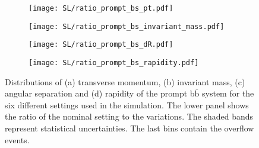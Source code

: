 \begin{figure}[H]
    \centering
    \begin{subfigure}{0.49\textwidth}
        \centering
        \texttt{[image: SL/ratio\_prompt\_bs\_pt.pdf]}
        \caption{}
        \label{app:subfig:pt(bbbar_prompt)_SL}
    \end{subfigure}
    \begin{subfigure}{0.49\textwidth}
        \centering
        \texttt{[image: SL/ratio\_prompt\_bs\_invariant\_mass.pdf]}
        \caption{}
        \label{app:subfig:m(bbbar_prompt)_SL}
    \end{subfigure}

    \vspace{0.2cm}
    
    \begin{subfigure}{0.49\textwidth}
        \centering
        \texttt{[image: SL/ratio\_prompt\_bs\_dR.pdf]}
        \caption{}
        \label{app:subfig:dR(bbbar_prompt)_SL}
    \end{subfigure}
    \begin{subfigure}{0.49\textwidth}
        \centering
        \texttt{[image: SL/ratio\_prompt\_bs\_rapidity.pdf]}
        \caption{}
        \label{app:subfig:y(bbbar_prompt)_SL}
    \end{subfigure}
    \caption{Distributions of (a) transverse momentum, (b) invariant mass,  (c) angular separation and (d) rapidity of the prompt b$\overline{\text{b}}$ system for the six different settings used in the simulation. The lower panel shows the ratio of the nominal setting to the variations. The shaded bands represent statistical uncertainties. The last bins contain the overflow events.}
    \label{app:fig:prompt_bbbar_SL}
\end{figure}


